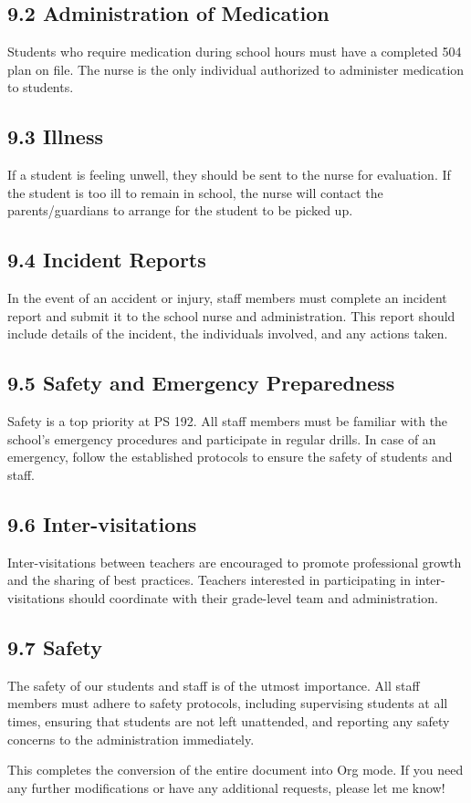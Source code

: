 \documentclass[11pt]{article}
\begin{document}
\subsection{9.2 Administration of Medication}
\label{sec:orgce5c2fc}

Students who require medication during school hours must have a completed 504 plan on file. The nurse is the only individual authorized to administer medication to students.

\subsection{9.3 Illness}
\label{sec:org3bd1d6e}

If a student is feeling unwell, they should be sent to the nurse for evaluation. If the student is too ill to remain in school, the nurse will contact the parents/guardians to arrange for the student to be picked up.

\subsection{9.4 Incident Reports}
\label{sec:org5185d32}

In the event of an accident or injury, staff members must complete an incident report and submit it to the school nurse and administration. This report should include details of the incident, the individuals involved, and any actions taken.

\subsection{9.5 Safety and Emergency Preparedness}
\label{sec:org95fd3f6}

Safety is a top priority at PS 192. All staff members must be familiar with the school’s emergency procedures and participate in regular drills. In case of an emergency, follow the established protocols to ensure the safety of students and staff.

\subsection{9.6 Inter-visitations}
\label{sec:orgb6e98dc}

Inter-visitations between teachers are encouraged to promote professional growth and the sharing of best practices. Teachers interested in participating in inter-visitations should coordinate with their grade-level team and administration.

\subsection{9.7 Safety}
\label{sec:org9350d84}

The safety of our students and staff is of the utmost importance. All staff members must adhere to safety protocols, including supervising students at all times, ensuring that students are not left unattended, and reporting any safety concerns to the administration immediately.

This completes the conversion of the entire document into Org mode. If you need any further modifications or have any additional requests, please let me know!
\end{document}

